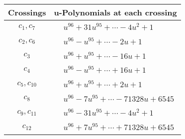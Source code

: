 \documentclass[1p]{elsarticle_modified}
\theoremstyle{definition}
\begin{document}
\begin{tabular}{m{50pt}|m{274pt}}
Crossings & \hspace{64pt}u-Polynomials at each crossing \\
\hline $$\begin{aligned}c_{1},c_{7}\end{aligned}$$&$\begin{aligned}
&u^{96}+31 u^{95}+\cdots-4 u^2+1
\end{aligned}$\\
\hline $$\begin{aligned}c_{2},c_{6}\end{aligned}$$&$\begin{aligned}
&u^{96}- u^{95}+\cdots-2 u+1
\end{aligned}$\\
\hline $$\begin{aligned}c_{3}\end{aligned}$$&$\begin{aligned}
&u^{96}+u^{95}+\cdots-16 u+1
\end{aligned}$\\
\hline $$\begin{aligned}c_{4}\end{aligned}$$&$\begin{aligned}
&u^{96}- u^{95}+\cdots+16 u+1
\end{aligned}$\\
\hline $$\begin{aligned}c_{5},c_{10}\end{aligned}$$&$\begin{aligned}
&u^{96}+u^{95}+\cdots+2 u+1
\end{aligned}$\\
\hline $$\begin{aligned}c_{8}\end{aligned}$$&$\begin{aligned}
&u^{96}-7 u^{95}+\cdots-71328 u+6545
\end{aligned}$\\
\hline $$\begin{aligned}c_{9},c_{11}\end{aligned}$$&$\begin{aligned}
&u^{96}-31 u^{95}+\cdots-4 u^2+1
\end{aligned}$\\
\hline $$\begin{aligned}c_{12}\end{aligned}$$&$\begin{aligned}
&u^{96}+7 u^{95}+\cdots+71328 u+6545
\end{aligned}$\\
\hline
\end{tabular}\newpage\renewcommand{\arraystretch}{1}
\end{document}
